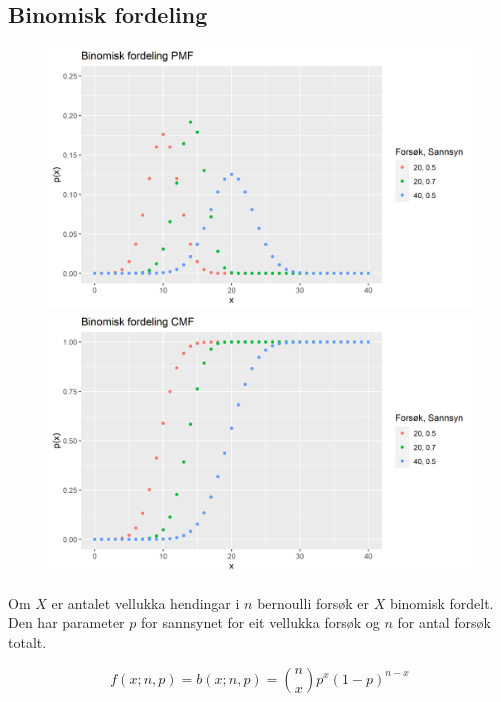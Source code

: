 \subsection{Binomisk fordeling}\label{chap:binomford}
\begin{figure}[H]
  \centering
  \begin{minipage}[b]{0.49\textwidth}
    \includegraphics[width=\textwidth]{bilete/binompmf.png}
  \end{minipage}
  \hfill
  \begin{minipage}[b]{0.49\textwidth}
    \includegraphics[width=\textwidth]{bilete/binomcdf.png}
  \end{minipage}
\end{figure}

Om $X$ er antalet vellukka hendingar i $n$ bernoulli forsøk er $X$ binomisk fordelt. Den har parameter $p$ for sannsynet for eit vellukka forsøk og $n$ for antal forsøk totalt.

\begin{equation}
    f(x; n, p) = b(x; n, p) = \binom{n}{x}p^x (1-p)^{n-x}
\end{equation}

